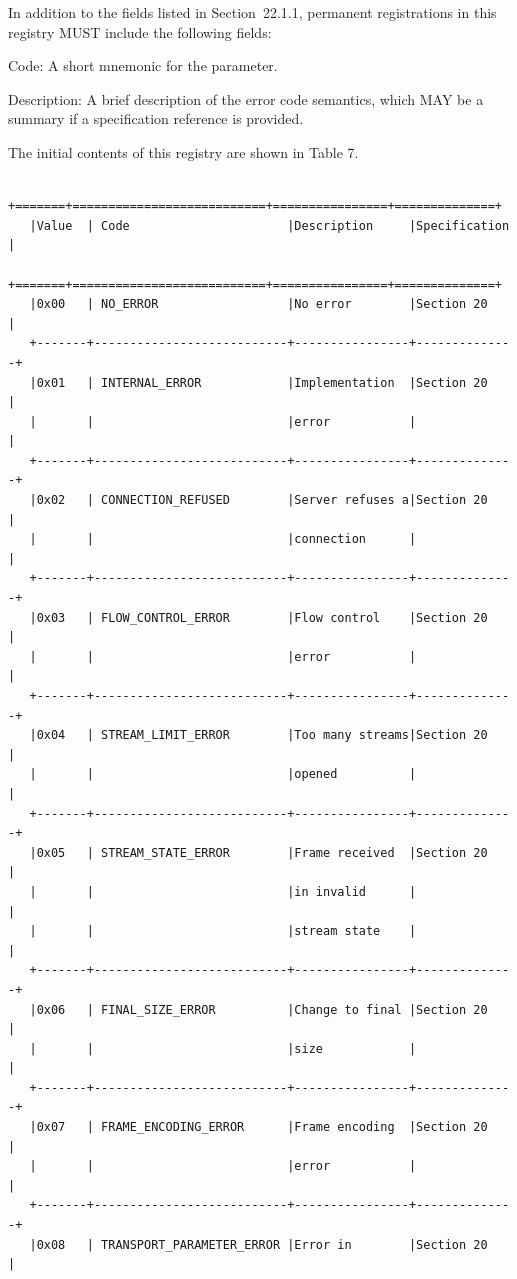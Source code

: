 \documentclass{article}
\begin{document}
In addition to the fields listed in Section~22.1.1, permanent registrations in this registry MUST include the following fields:

Code:  A short mnemonic for the parameter.

Description:  A brief description of the error code semantics, which MAY be a summary if a specification reference is provided.

The initial contents of this registry are shown in Table 7.

\begin{verbatim}
   +=======+===========================+================+==============+
   |Value  | Code                      |Description     |Specification |
   +=======+===========================+================+==============+
   |0x00   | NO_ERROR                  |No error        |Section 20    |
   +-------+---------------------------+----------------+--------------+
   |0x01   | INTERNAL_ERROR            |Implementation  |Section 20    |
   |       |                           |error           |              |
   +-------+---------------------------+----------------+--------------+
   |0x02   | CONNECTION_REFUSED        |Server refuses a|Section 20    |
   |       |                           |connection      |              |
   +-------+---------------------------+----------------+--------------+
   |0x03   | FLOW_CONTROL_ERROR        |Flow control    |Section 20    |
   |       |                           |error           |              |
   +-------+---------------------------+----------------+--------------+
   |0x04   | STREAM_LIMIT_ERROR        |Too many streams|Section 20    |
   |       |                           |opened          |              |
   +-------+---------------------------+----------------+--------------+
   |0x05   | STREAM_STATE_ERROR        |Frame received  |Section 20    |
   |       |                           |in invalid      |              |
   |       |                           |stream state    |              |
   +-------+---------------------------+----------------+--------------+
   |0x06   | FINAL_SIZE_ERROR          |Change to final |Section 20    |
   |       |                           |size            |              |
   +-------+---------------------------+----------------+--------------+
   |0x07   | FRAME_ENCODING_ERROR      |Frame encoding  |Section 20    |
   |       |                           |error           |              |
   +-------+---------------------------+----------------+--------------+
   |0x08   | TRANSPORT_PARAMETER_ERROR |Error in        |Section 20    |

\end{verbatim}
\end{document}
